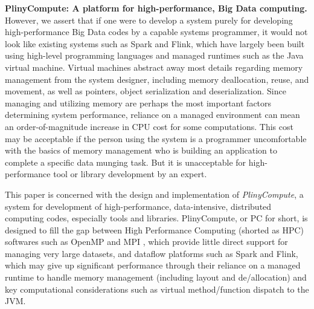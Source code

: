 \vspace{5 pt}
\noindent
\textbf{PlinyCompute: A platform for high-performance, Big Data computing.}
However, we assert that if one were to develop a system purely for developing high-performance
Big Data codes
by a capable systems programmer,
it would not look like existing systems such as Spark and Flink,
which have largely 
been built using high-level programming languages and managed runtimes such as the Java 
virtual machine.  Virtual machines abstract away
most details regarding memory management
from the system designer, including memory deallocation, reuse, and movement, as well as pointers,
object serialization and deserialization.
Since managing and utilizing memory are 
perhaps the most important factors determining system performance, reliance
on a managed environment can mean an order-of-magnitude increase in CPU cost for some computations.  
This cost may be acceptable if the person using the system
is a programmer uncomfortable with the basics of memory management who is
building an application to complete a specific data munging task.  
But it is unacceptable for high-performance tool or library development by an expert.

This paper is concerned with the design and implementation of
\emph{PlinyCompute}, a system for development of
high-performance, data-intensive, distributed computing codes, especially tools and libraries.
PlinyCompute, or PC for short, is designed to fill the gap between
High Performance Computing (shorted as HPC) softwares such as OpenMP \cite{dagum1998openmp} and MPI \cite{gropp1996high}, which provide little direct support for
managing very large datasets, and dataflow platforms such as Spark and Flink, which 
may give up significant performance through their reliance on a managed runtime to handle
memory management (including layout and de/allocation) and key computational considerations
such as virtual method/function dispatch to the JVM. 

